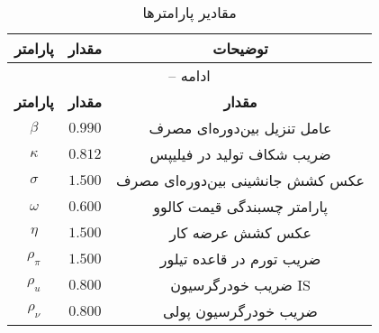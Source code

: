 \begin{center}
\begin{longtable}{ccc}
\caption{مقادیر پارامترها}\\%
\toprule%
\multicolumn{1}{c}{\textbf{پارامتر}} &
\multicolumn{1}{c}{\textbf{مقدار}} &
 \multicolumn{1}{c}{\textbf{توضیحات}}\\%
\midrule%
\endfirsthead
\multicolumn{3}{c}{{\tablename} \thetable{} -- ادامه}\\%
\midrule%
\multicolumn{1}{c}{\textbf{پارامتر}} &
\multicolumn{1}{c}{\textbf{مقدار}} &
  \multicolumn{1}{c}{\textbf{مقدار}}\\%
\midrule%
\endhead
$\beta$ 	 & $ 	 0.990 	 $ & 	 عامل تنزیل بین‌دوره‌ای مصرف\\
$\kappa$ 	 & $ 	 0.812 	 $ & 	 ضریب شکاف تولید در فیلیپس\\
$\sigma$ 	 & $ 	 1.500 	 $ & 	 عکس کشش جانشینی بین‌دوره‌ای مصرف\\
$\omega$ 	 & $ 	 0.600 	 $ & 	 پارامتر چسبندگی قیمت کالوو\\
$\eta$ 	 & $ 	 1.500 	 $ & 	 عکس کشش عرضه کار\\
$\rho_{\pi}$ 	 & $ 	 1.500 	 $ & 	 ضریب تورم در قاعده تیلور\\
$\rho_u$ 	 & $ 	 0.800 	 $ & 	 ضریب خودرگرسیون IS\\
$\rho_{\nu}$ 	 & $ 	 0.800 	 $ & 	 ضریب خودرگرسیون پولی\\
\bottomrule%
\end{longtable}
\end{center}

